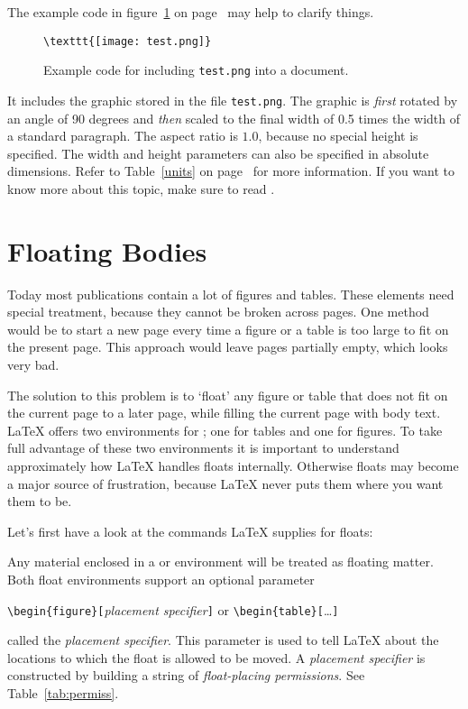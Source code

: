 The example code in figure~\ref{figureex} on page~\pageref{figureex} may help to clarify things.
\begin{figure}
\begin{lined}{9cm}
\begin{verbatim}
\texttt{[image: test.png]}
\end{verbatim}
\end{lined}
\caption{Example code for including \texttt{test.png} into a document.\label{figureex}}
\end{figure}
It includes the graphic stored in the file \texttt{test.png}. The
graphic is \emph{first} rotated by an angle of 90 degrees and
\emph{then} scaled to the final width of 0.5 times the width of a
standard paragraph.  The aspect ratio is $1.0$, because no special
height is specified.  The width and height parameters can also be
specified in absolute dimensions. Refer to Table~\ref{units} on
page~\pageref{units} for more information. If you want to know more
about this topic, make sure to read \cite{graphics}.

\section{Floating Bodies}
Today most publications contain a lot of figures and tables. These
elements need special treatment, because they cannot be broken across
pages.  One method would be to start a new page every time a figure or
a table is too large to fit on the present page. This approach would
leave pages partially empty, which looks very bad.

The solution to this problem is to `float' any figure or table that
does not fit on the current page to a later page, while filling the
current page with body text. \LaTeX{} offers two environments for
; one for tables and  one for figures.  To
take full advantage of these two environments it is important to
understand approximately how \LaTeX{} handles floats internally.
Otherwise floats may become a major source of frustration, because
\LaTeX{} never puts them where you want them to be.

\bigskip
Let's first have a look at the commands \LaTeX{} supplies
for floats:

Any material enclosed in a  or  environment will
be treated as floating matter. Both float environments support an optional
parameter
\begin{lscommand}
\verb|\begin{figure}[|\emph{placement specifier}\verb|]| or
\verb|\begin{table}[|\ldots\verb|]|
\end{lscommand}
\noindent called the \emph{placement specifier}. This parameter
is used to tell \LaTeX{} about the locations to which the float
is allowed to be moved.  A \emph{placement specifier} is constructed by building a string
of \emph{float-placing permissions}. See Table~\ref{tab:permiss}.

